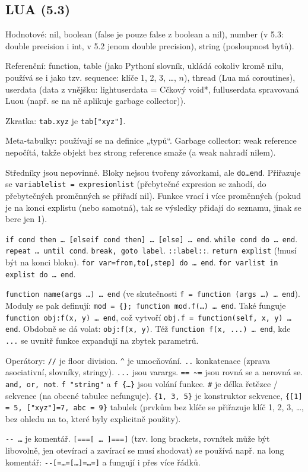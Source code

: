 \documentclass[12pt]{article}					%
\begin{document}
    \subsection{LUA (5.3)}
        \begin{definice}[Typy]
            Hodnotové: nil, boolean (false je pouze false z boolean a nil), number (v 5.3: double precision i int, v 5.2 jenom double precision), string (posloupnost bytů).

            Referenční: function, table (jako Pythoní slovník, ukládá cokoliv kromě nilu, používá se i jako tzv. sequence: klíče 1, 2, 3, …, $n$), thread (Lua má coroutines), userdata (data z vnějšku: lightuserdata = Cčkový void*, fulluserdata spravovaná Luou (např. se na ně aplikuje garbage collector)).

            Zkratka: \verb|tab.xyz| je \verb|tab["xyz"]|.

            Meta-tabulky: používají se na definice „typů“. Garbage collector: weak reference nepočítá, takže objekt bez strong reference smaže (a weak nahradí nilem).
        \end{definice}

        \begin{definice}[Syntax]
            Středníky jsou nepovinné. Bloky nejsou tvořeny závorkami, ale \verb|do…end|. Přiřazuje se \verb|variablelist = expresionlist| (přebytečné expresion se zahodí, do přebytečných proměnných se přiřadí nil). Funkce vrací i více proměnných (pokud je na konci explistu (nebo samotná), tak se výsledky přidají do seznamu, jinak se bere jen 1).

            \verb|if cond then … [elseif cond then] … [else] … end|. \verb|while cond do … end|. \verb|repeat … until cond|. \verb|break, goto label|. \verb|::label::|. \verb|return explist| (!musí být na konci bloku). \verb|for var=from,to[,step] do … end|. \verb|for varlist in explist do … end|.

            \verb|function name(args …) … end| (ve skutečnosti \verb|f = function (args …) … end|). Moduly se pak definují: \verb|mod = {}; function mod.f(…) … end|. Také funguje \verb|function obj:f(x, y) … end|, což vytvoří \verb|obj.f = function(self, x, y) … end|. Obdobně se dá volat: \verb|obj:f(x, y)|. Též \verb|function f(x, ...) … end|, kde \verb|...| se uvnitř funkce expandují na zbytek parametrů.

            Operátory: \verb|//| je floor division. \verb|^| je umocňování. \verb|..| konkatenace (zprava asociativní, slovníky, stringy). \verb|...| jsou varargs. \verb|== ~=| jsou rovná se a nerovná se. \verb|and, or, not|. \verb|f "string"| a \verb|f {…}| jsou volání funkce. \verb|#| je délka řetězce / sekvence (na obecné tabulce nefunguje). \verb|{1, 3, 5}| je konstruktor sekvence, \verb|{[1] = 5, ["xyz"]=7, abc = 9}| tabulek (prvkům bez klíče se přiřazuje klíč 1, 2, 3, …, bez ohledu na to, které byly explicitně použity).

            \verb|-- …| je komentář. \verb|[===[ … ]===]| (tzv. long brackets, rovnítek může být libovolně, jen otevírací a zavírací se musí shodovat) se používá např. na long komentář: \verb|--[=…=[…]=…=]| a fungují i přes více řádků.
        \end{definice}
\end{document}

